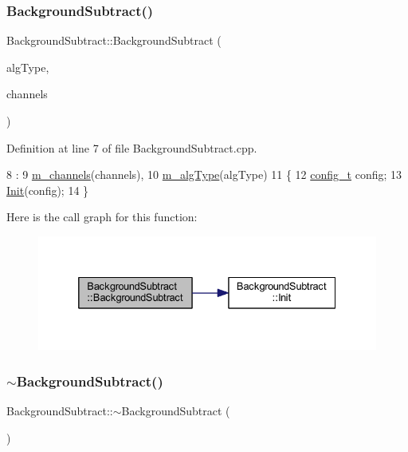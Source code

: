 \subsubsection{\texorpdfstring{Background\+Subtract()}{BackgroundSubtract()}}
{\footnotesize\ttfamily Background\+Subtract\+::\+Background\+Subtract (\begin{DoxyParamCaption}\item[{\mbox{\hyperlink{class_background_subtract_a56850081696df68b55f87b4f3d87949f}{B\+G\+F\+G\+\_\+\+A\+L\+GS}}}]{alg\+Type,  }\item[{int}]{channels }\end{DoxyParamCaption})}



Definition at line 7 of file Background\+Subtract.\+cpp.


\begin{DoxyCode}
8     :
9       \mbox{\hyperlink{class_background_subtract_a676897a571788e0fee84d568bc68caf0}{m\_channels}}(channels),
10       \mbox{\hyperlink{class_background_subtract_a3d569052b6954fa87f04a0aa8a970f97}{m\_algType}}(algType)
11 \{
12     \mbox{\hyperlink{defines_8h_a81d657237a541d02f8eeefdd40191920}{config\_t}} config;
13     \mbox{\hyperlink{class_background_subtract_a9dacb4cc5cf41c4a37cc776a8142aecc}{Init}}(config);
14 \}
\end{DoxyCode}
Here is the call graph for this function\+:\nopagebreak
\begin{figure}[H]
\begin{center}
\leavevmode
\includegraphics[width=332pt]{class_background_subtract_a0b5096a3823c7af66b6d22cdd36e8fda_cgraph}
\end{center}
\end{figure}
\mbox{\label{class_background_subtract_ac811f4c717052b81d1e0bd633d265423}} 
\subsubsection{\texorpdfstring{$\sim$\+Background\+Subtract()}{~BackgroundSubtract()}}
{\footnotesize\ttfamily Background\+Subtract\+::$\sim$\+Background\+Subtract (\begin{DoxyParamCaption}{ }\end{DoxyParamCaption})}



